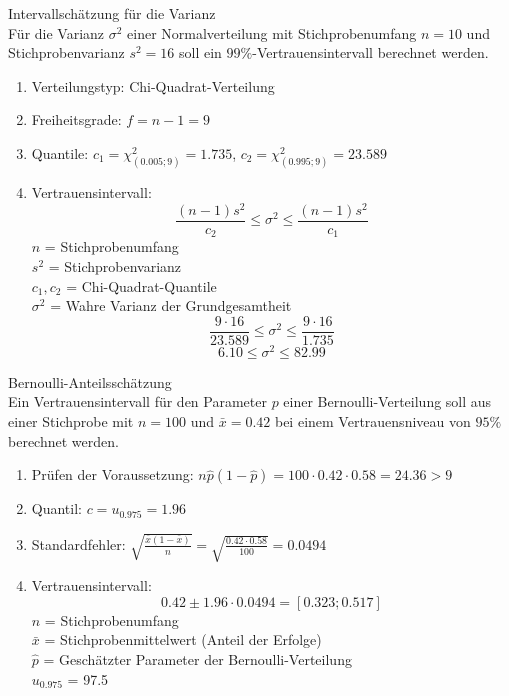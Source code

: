 \begin{example}{Intervallschätzung für die Varianz} \\
  Für die Varianz $\sigma^2$ einer Normalverteilung mit Stichprobenumfang $n=10$ und Stichprobenvarianz $s^2=16$ soll ein $99\%$-Vertrauensintervall berechnet werden.

\begin{enumerate}
  \item Verteilungstyp: Chi-Quadrat-Verteilung
  \item Freiheitsgrade: $f=n-1=9$
  \item Quantile: $c_1=\chi^2_{(0.005;9)}=1.735$, $c_2=\chi^2_{(0.995;9)}=23.589$
  \item Vertrauensintervall:
  $$
  \frac{(n-1)s^2}{c_2} \leq \sigma^2 \leq \frac{(n-1)s^2}{c_1}
  $$
  $n$ = Stichprobenumfang\\
  $s^2$ = Stichprobenvarianz\\
  $c_1, c_2$ = Chi-Quadrat-Quantile\\
  $\sigma^2$ = Wahre Varianz der Grundgesamtheit\\
  $$
  \frac{9 \cdot 16}{23.589} \leq \sigma^2 \leq \frac{9 \cdot 16}{1.735}
  $$
  $$
  6.10 \leq \sigma^2 \leq 82.99
  $$
\end{enumerate}
\end{example}

\begin{example}{Bernoulli-Anteilsschätzung}\\
Ein Vertrauensintervall für den Parameter $p$ einer Bernoulli-Verteilung soll aus einer Stichprobe mit $n=100$ und $\bar{x}=0.42$ bei einem Vertrauensniveau von $95\%$ berechnet werden.

\begin{enumerate}
  \item Prüfen der Voraussetzung: $n\hat{p}(1-\hat{p})=100 \cdot 0.42 \cdot 0.58 = 24.36 > 9$
  \item Quantil: $c=u_{0.975}=1.96$
  \item Standardfehler: $\sqrt{\frac{\bar{x}(1-\bar{x})}{n}}=\sqrt{\frac{0.42 \cdot 0.58}{100}}=0.0494$
  \item Vertrauensintervall:
  $$
  0.42 \pm 1.96 \cdot 0.0494 = [0.323; 0.517]
  $$
$n$ = Stichprobenumfang\\
$\bar{x}$ = Stichprobenmittelwert (Anteil der Erfolge)\\
$\hat{p}$ = Geschätzter Parameter der Bernoulli-Verteilung\\
$u_{0.975}$ = 97.5%
\end{enumerate}
\end{example}
